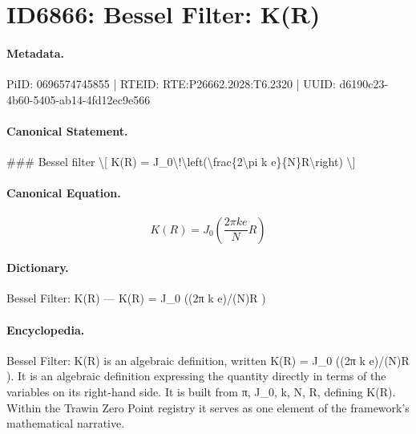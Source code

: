 \section*{ID6866: Bessel Filter: K(R)}
\paragraph{Metadata.}
PiID: 0696574745855 | RTEID: RTE:P26662.2028:T6.2320 | UUID: d6190c23-4b60-5405-ab14-4fd12ec9e566

\paragraph{Canonical Statement.}
\#\#\# Bessel filter \textbackslash{}[ K(R) = J\_0\textbackslash{}!\textbackslash{}left(\textbackslash{}frac\{2\textbackslash{}pi k e\}\{N\}R\textbackslash{}right) \textbackslash{}]

\paragraph{Canonical Equation.}
\[
K(R) = J_0\!\left(\frac{2\pi k e}{N}R\right)
\]

\paragraph{Dictionary.}
Bessel Filter: K(R) — K(R) = J\_0 ((2π k e)/(N)R )

\paragraph{Encyclopedia.}
Bessel Filter: K(R) is an algebraic definition, written K(R) = J\_0 ((2π k e)/(N)R ). It is an algebraic definition expressing the quantity directly in terms of the variables on its right-hand side. It is built from π, J\_0, k, N, R, defining K(R). Within the Trawin Zero Point registry it serves as one element of the framework's mathematical narrative.
